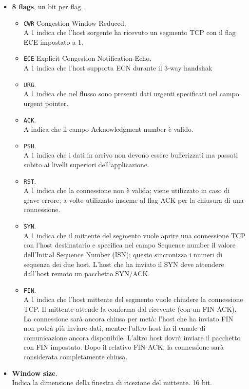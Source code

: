 \begin{itemize}
	\item \textbf{8 flags}, un bit per flag.
	\begin{itemize}
		\item \verb|CWR| Congestion Window Reduced.\\ 
		A 1 indica che l'host sorgente ha ricevuto un segmento TCP con il flag ECE impostato a 1.
		\item \verb|ECE| Explicit Congestion Notification-Echo.\\ 
		A 1 indica che l'host supporta ECN durante il 3-way handshak
		\item \verb|URG|.\\
		A 1 indica che nel flusso sono presenti dati urgenti specificati nel campo urgent pointer.
		\item \verb|ACK|.\\
		A indica che il campo Acknowledgment number è valido.
		\item \verb|PSH|.\\
		A 1 indica che i dati in arrivo non devono essere bufferizzati ma passati subito ai livelli superiori dell'applicazione.
		\item \verb|RST|.\\
		A 1 indica che la connessione non è valida; viene utilizzato in caso di grave errore; a volte utilizzato insieme al flag ACK per la chiusura di una connessione.
		\item \verb|SYN|.\\
		A 1 indica che il mittente del segmento vuole aprire una connessione TCP con l'host destinatario e specifica nel campo Sequence number il valore dell'Initial Sequence Number (ISN); questo sincronizza i numeri di sequenza dei due host. L'host che ha inviato il SYN deve attendere dall'host remoto un pacchetto SYN/ACK.
		\item \verb|FIN|.\\
		A 1 indica che l'host mittente del segmento vuole chiudere la connessione TCP. Il mittente attende la conferma dal ricevente (con un FIN-ACK). La connessione sarà ancora chiusa per metà: l'host che ha inviato FIN non potrà più inviare dati, mentre l'altro host ha il canale di comunicazione ancora disponibile. L'altro host dovrà inviare il pacchetto con FIN impostato. Dopo il relativo FIN-ACK, la connessione sarà considerata completamente chiusa.
	\end{itemize}
	
	\item \textbf{Window size}.\\ 
	Indica la dimensione della finestra di ricezione del mittente. 16 bit.
	

\end{itemize}
